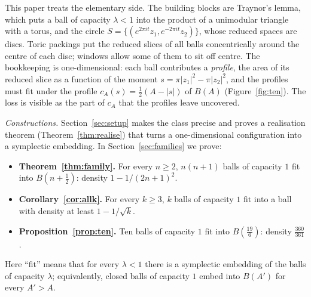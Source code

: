 \documentclass[11pt]{amsart}
\begin{document}
This paper treats the elementary side. The building blocks are Traynor's lemma, which puts a ball of capacity
$\lambda<1$ into the product of a unimodular triangle with a torus, and the circle
$S=\{(e^{2\pi it}z_1,e^{-2\pi it}z_2)\}$, whose reduced spaces are discs. Toric packings put the reduced slices of all
balls concentrically around the centre of each disc; windows allow some of them to sit off centre. The
bookkeeping is one-dimensional: each ball contributes a \emph{profile}, the area of its reduced slice as a
function of the moment $s=\pi|z_1|^2-\pi|z_2|^2$, and the profiles must fit under the profile
$c_A(s)=\frac12(A-|s|)$ of $B(A)$ (Figure~\ref{fig:ten}). The loss is visible as the part of $c_A$ that the
profiles leave uncovered.

\emph{Constructions.} Section~\ref{sec:setup} makes the class precise and proves a realisation theorem
(Theorem~\ref{thm:realise}) that turns a one-dimensional configuration into a symplectic embedding. In
Section~\ref{sec:families} we prove:
\begin{itemize}[leftmargin=2em]
\item \textbf{Theorem~\ref{thm:family}.} For every $n\ge2$, $n(n+1)$ balls of capacity $1$ fit into
  $B(n+\frac12)$: density $1-1/(2n+1)^2$.
\item \textbf{Corollary~\ref{cor:allk}.} For every $k\ge3$, $k$ balls of capacity $1$ fit into a ball with density
  at least $1-1/\sqrt k$.
\item \textbf{Proposition~\ref{prop:ten}.} Ten balls of capacity $1$ fit into $B(\frac{19}{6})$: density
  $\frac{360}{361}$.
\end{itemize}
Here ``fit'' means that for every $\lambda<1$ there is a symplectic embedding of the balls of capacity $\lambda$;
equivalently, closed balls of capacity $1$ embed into $B(A')$ for every $A'>A$.
\end{document}
